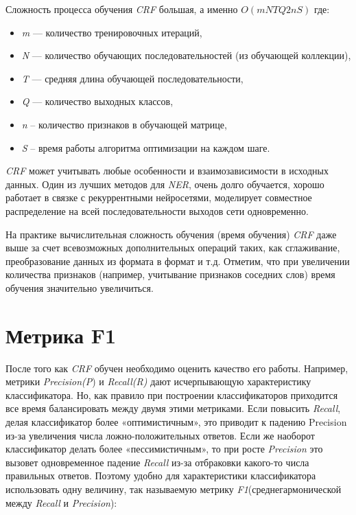 \documentclass{csmathnotes}
\begin{document}
Сложность процесса обучения \emph{CRF} большая, а именно $O(mNTQ2nS)$ где:
\begin{itemize}
    \item \emph{m} — количество тренировочных итераций,
    \item \emph{N} — количество обучающих последовательностей (из обучающей коллекции),
    \item \emph{T} — средняя длина обучающей последовательности,
    \item \emph{Q} — количество выходных классов,
    \item \emph{n} – количество признаков в обучающей матрице,
    \item \emph{S} – время работы алгоритма оптимизации на каждом шаге. 
\end{itemize}


\emph{CRF} может учитывать любые особенности и взаимозависимости в исходных данных. Один из лучших методов для \emph{NER}, очень долго обучается, хорошо работает в связке с рекуррентными нейросетями, моделирует совместное распределение на всей последовательности выходов сети одновременно.

На практике вычислительная сложность обучения (время обучения) \emph{CRF} даже выше за счет всевозможных дополнительных операций таких, как сглаживание, преобразование данных из формата в формат и т.д. Отметим, что при увеличении количества признаков (например, учитывание признаков соседних слов) время обучения значительно увеличиться. 

\section*{Метрика F1}
После того как \emph{CRF} обучен необходимо оценить качество его работы. Например, метрики \emph{Precision(P}) и \emph{Recall(R)} дают исчерпывающую характеристику классификатора. Но, как правило при построении классификаторов приходится все время балансировать между двумя этими метриками. Если повысить \emph{Recall}, делая классификатор более «оптимистичным», это приводит к падению Precision из-за увеличения числа ложно-положительных ответов. Если же наоборот классификатор делать более «пессимистичным», то при росте \emph{Precision} это вызовет одновременное падение \emph{Recall} из-за отбраковки какого-то числа правильных ответов. Поэтому удобно для характеристики классификатора использовать одну величину, так называемую метрику \emph{F1}(среднегармонической между \emph{Recall} и \emph{Precision}):
\end{document}
